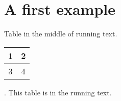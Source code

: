 \documentclass[10pt, a4paper]{article}
\begin{document}
\section{A first example}
Table in the middle of running text.
\begin{tabular}[c]{c|c}
\hline
1 & 2 \\
\hline 
3 & 4\\
\hline
\end{tabular}. This table is in the running text.
\end{document}
